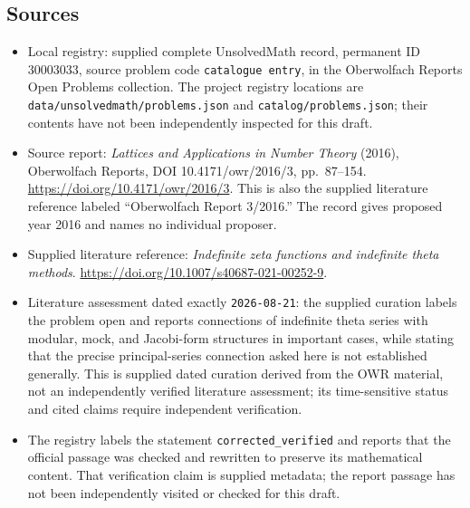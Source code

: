 \documentclass[11pt]{article}
\begin{document}
\subsection{Sources}
\begin{itemize}
\item Local registry: supplied complete UnsolvedMath record, permanent ID \(30003033\), source problem code \texttt{catalogue entry}, in the Oberwolfach Reports Open Problems collection. The project registry locations are \texttt{data/unsolvedmath/problems.json} and \texttt{catalog/problems.json}; their contents have not been independently inspected for this draft.
\item Source report: \emph{Lattices and Applications in Number Theory} (2016), Oberwolfach Reports, DOI 10.4171/owr/2016/3, pp.\ 87--154. \url{https://doi.org/10.4171/owr/2016/3}. This is also the supplied literature reference labeled ``Oberwolfach Report 3/2016.'' The record gives proposed year 2016 and names no individual proposer.
\item Supplied literature reference: \emph{Indefinite zeta functions and indefinite theta methods}. \url{https://doi.org/10.1007/s40687-021-00252-9}.
\item Literature assessment dated exactly \texttt{2026-08-21}: the supplied curation labels the problem open and reports connections of indefinite theta series with modular, mock, and Jacobi-form structures in important cases, while stating that the precise principal-series connection asked here is not established generally. This is supplied dated curation derived from the OWR material, not an independently verified literature assessment; its time-sensitive status and cited claims require independent verification.
\item The registry labels the statement \texttt{corrected\_verified} and reports that the official passage was checked and rewritten to preserve its mathematical content. That verification claim is supplied metadata; the report passage has not been independently visited or checked for this draft.
\end{itemize}
\end{document}
